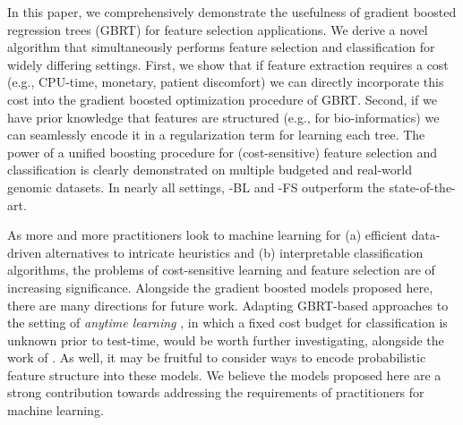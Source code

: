 
\label{sec:conclusion}
In this paper, we comprehensively demonstrate the usefulness of gradient boosted regression trees (GBRT) for feature selection applications. We derive a novel algorithm that simultaneously performs feature selection and classification for widely differing settings. First, we show that if feature extraction requires a cost (e.g., CPU-time, monetary, patient discomfort) we can directly incorporate this cost into the gradient boosted optimization procedure of GBRT. Second, if we have prior knowledge that features are structured (e.g., for bio-informatics) we can seamlessly encode it in a regularization term for learning each tree. The power of a unified boosting procedure for (cost-sensitive) feature selection and classification is clearly demonstrated on multiple budgeted and real-world genomic datasets. In nearly all settings, \name{}-BL and \name{}-FS outperform the state-of-the-art.

As more and more practitioners look to machine learning for (a) efficient data-driven alternatives to intricate heuristics and (b) interpretable classification algorithms, the problems of cost-sensitive learning and feature selection are of increasing significance. Alongside the gradient boosted models proposed here, there are many directions for future work. Adapting GBRT-based approaches to the setting of \emph{anytime learning} \cite{zilberstein1996using}, in which a fixed cost budget for classification is unknown prior to test-time, would be worth further investigating, alongside the work of \citet{grubbspeedboost}. As well, it may be fruitful to consider ways to encode probabilistic feature structure into these models. We believe the models proposed here are a strong contribution towards addressing the requirements of practitioners for machine learning.